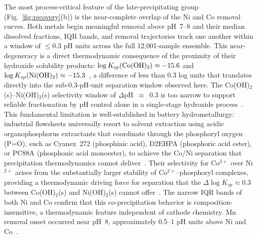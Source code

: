 \documentclass[final,2p,times]{elsarticle}
\begin{document}
The most process-critical feature of the late-precipitating group (Fig.~\ref{fig:recovery}(b)) is the near-complete overlap of the Ni and Co removal curves. Both metals begin meaningful removal above pH~7--8 and their median dissolved fractions, IQR bands, and removal trajectories track one another within a window of $\leq$0.3 pH units across the full 12{,}001-sample ensemble. This near-degeneracy is a direct thermodynamic consequence of the proximity of their hydroxide solubility products: $\log K_{sp}({\rm Co(OH)_2}) \approx -15.6$ and $\log K_{sp}({\rm Ni(OH)_2}) \approx -15.3$~\cite{noauthor_ksp_nodate, bard_electrochemical_2022}, a difference of less than 0.3 log units that translates directly into the sub-0.3-pH-unit separation window observed here. The Co(OH)$_2$(s)--Ni(OH)$_2$(s) selectivity window of $\Delta$pH~$\approx$~0.3 is too narrow to support reliable fractionation by pH control alone in a single-stage hydroxide process~\cite{free_hydrometallurgy_2021, zanoletti_review_2024, larouche_progress_2020}. This fundamental limitation is well-established in battery hydrometallurgy: industrial flowsheets universally resort to solvent extraction using acidic organophosphorus extractants that coordinate through the phosphoryl oxygen (P=O), such as Cyanex~272 (phosphinic acid), D2EHPA (phosphoric acid ester), or PC88A (phosphonic acid monoester), to achieve the Co/Ni separation that precipitation thermodynamics cannot deliver~\cite{rickelton_cobalt-nickel_1984, preston_solvent_1982, swain_separation_2015, swain_separation_2016, virolainen_removal_2017, rabah_recovery_2008}. Their selectivity for Co$^{2+}$ over Ni$^{2+}$ arises from the substantially larger stability of Co$^{2+}$--phosphoryl complexes, providing a thermodynamic driving force for separation that the $\Delta\log K_{sp} \approx 0.3$ between Co(OH)$_2$(s) and Ni(OH)$_2$(s) cannot offer~\cite{rickelton_cobalt-nickel_1984, preston_solvent_1982}. The narrow IQR bands of both Ni and Co confirm that this co-precipitation behavior is composition-insensitive, a thermodynamic feature independent of cathode chemistry. Mn removal onset occurred near pH~8, approximately 0.5--1 pH units above Ni and Co~\cite{free_hydrometallurgy_2021, larouche_progress_2020}.
\end{document}
